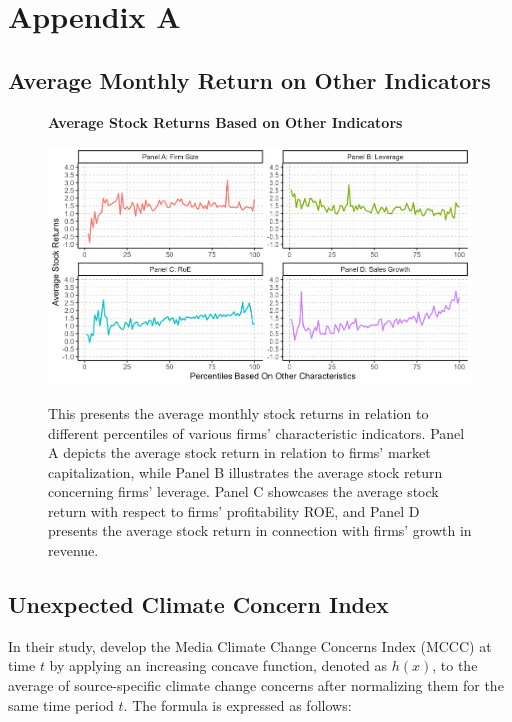 \documentclass[12pt]{article}
\begin{document}
\section*{Appendix A} \label{sec: appendixa}
\subsection{Average Monthly Return on Other Indicators}

\begin{figure}[!ht]
\centering
\caption{\textbf{Average Stock Returns Based on Other Indicators}}
\includegraphics{image/others_percentile.png}
\label{fig: others_persentile}
\caption*{\footnotesize{This presents the average monthly stock returns in relation to different percentiles of various firms' characteristic indicators. Panel A depicts the average stock return in relation to firms' market capitalization, while Panel B illustrates the average stock return concerning firms' leverage. Panel C showcases the average stock return with respect to firms' profitability ROE, and Panel D presents the average stock return in connection with firms' growth in revenue.}}
\end{figure}

\subsection{Unexpected Climate Concern Index}
\label{sec: mcc}

In their study, \cite{ardia2022climate} develop the Media Climate Change Concerns Index (MCCC) at time $t$ by applying an increasing concave function, denoted as $h(x)$, to the average of source-specific climate change concerns after normalizing them for the same time period $t$. The formula is expressed as follows:
\end{document}
